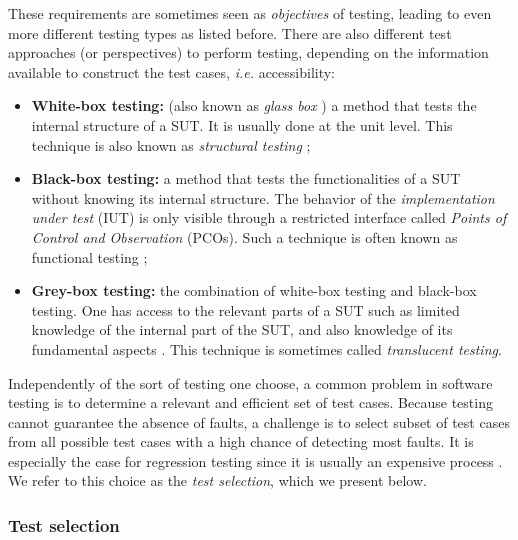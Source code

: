 These requirements are sometimes seen as \textit{objectives} of
testing, leading to even more different testing types as listed
before. There are also different test approaches \cite{5733835}
(or perspectives) to perform testing, depending on the
information available to construct the test cases, \emph{i.e.}
accessibility:

\begin{itemize}
    \item \textbf{White-box testing:} (also known as \emph{glass box}
        \cite{5733835}) a method that tests the internal
        structure of a SUT. It is usually done at the unit level.
        This technique is also known as \emph{structural testing}
        \cite{5733835};

    \item \textbf{Black-box testing:} a method that tests the
        functionalities of a SUT without knowing its internal
        structure. The behavior of the \textit{implementation
        under test} (IUT) is only visible through a restricted
        interface called \textit{Points of Control and
        Observation} (PCOs). Such a technique is often known as
        functional testing \cite{5733835};

    \item \textbf{Grey-box testing:} the combination of white-box
        testing and black-box testing. One has access to the
        relevant parts of a SUT such as limited knowledge of the
        internal part of the SUT, and also knowledge of its
        fundamental aspects \cite{khan2012comparative}. This
        technique is sometimes called \emph{translucent testing}.
\end{itemize}

Independently of the sort of testing one choose, a common problem
in software testing is to determine a relevant and efficient set
of test cases. Because testing cannot guarantee the absence of
faults, a challenge is to select subset of test cases from all
possible test cases with a high chance of detecting most faults.
It is especially the case for regression testing since it is
usually an expensive process
\cite{Rothermel:1997:SER:248233.248262,graves2001empirical}. We
refer to this choice as the \emph{test selection}, which we
present below.

\subsubsection{Test selection}

